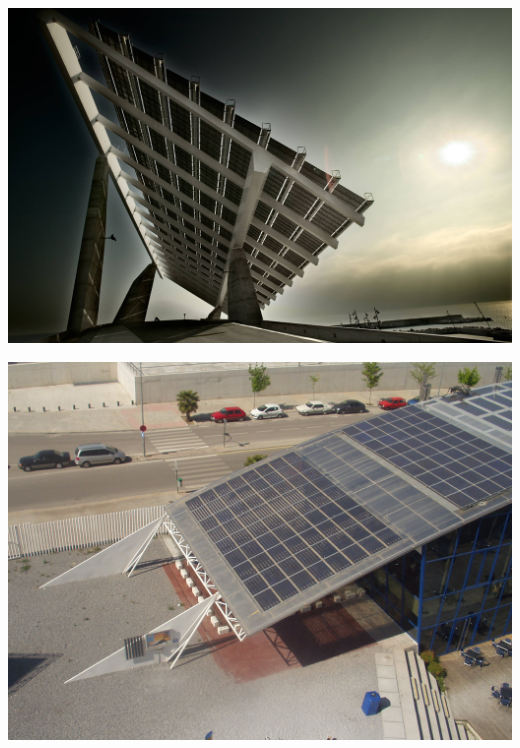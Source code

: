 \documentclass[xcolor={usenames,svgnames,dvipsnames}]{beamer}
\begin{document}
\begin{frame}[label={sec:org6b70d2f}]{}
\begin{center}
\includegraphics[width=\textwidth]{../figs/Forum.JPG}
\end{center}
\end{frame}

\begin{frame}[label={sec:org0695364}]{}
\begin{center}
\includegraphics[width=.9\linewidth]{../figs/p1010007.jpg}
\end{center}
\end{frame}
\end{document}
